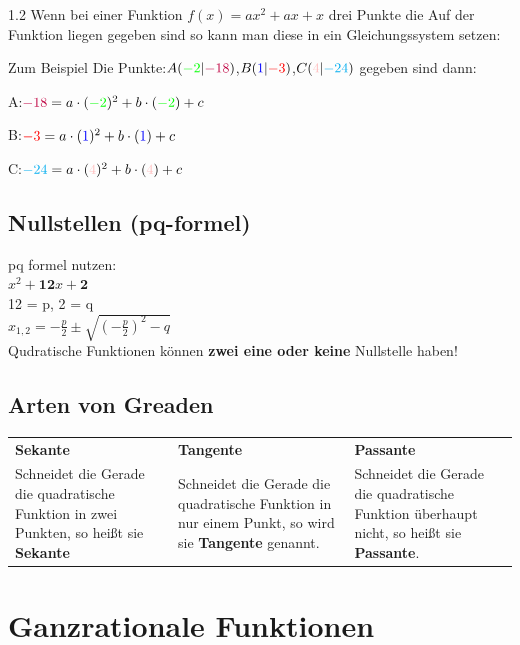 \documentclass{article}
\newcommand{\Zeilenabstand}{1.2}
\begin{document}
\begin{spacing}{\Zeilenabstand}
    Wenn bei einer Funktion $f(x)= ax^{2}+ax+x$ drei Punkte die Auf der Funktion liegen gegeben sind
    so kann man diese in ein Gleichungssystem setzen:

    Zum Beispiel Die Punkte:$A({\color{green}-2} | {\color{purple}- 18})$,$B({\color{blue}1}|{\color{red}-3})$,$C({\color{pink}4}|{\color{cyan}-24})$ gegeben sind dann:

    A:\@ ${\color{purple}-18} = a \cdot ({\color{green}-2})^2 +b \cdot ({\color{green}-2}) + c $

    B:\@ ${\color{red}-3} = a \cdot ({\color{blue}1})^2 +b \cdot ({\color{blue}1}) + c $

    C:\@ ${\color{cyan}-24} = a \cdot ({\color{pink}4})^2 +b \cdot ({\color{pink}4}) + c$



    \subsection{Nullstellen (pq-formel) }
    pq formel nutzen:\\
    $x^2 +\textbf{12}x +\textbf{2}$\\
    12 = p, 2 = q\\
    $x_{1,2} = -\frac{p}{2} \pm \sqrt{(-\frac{p}{2})^2-q}$\\
    Qudratische Funktionen können \textbf{zwei eine oder keine} Nullstelle haben!

    \subsection{Arten von Greaden}
    \hfill \break
    \begin{tabular}{p{5cm} p{5cm} p{5cm}}
        \textbf{Sekante} & \textbf{Tangente} & \textbf{Passante}\\
        Schneidet die Gerade die quadratische Funktion in zwei Punkten, so heißt sie \textbf{Sekante} &
        Schneidet die Gerade die quadratische Funktion in nur einem Punkt, so wird sie \textbf{Tangente} genannt. &
        Schneidet die Gerade die quadratische Funktion überhaupt nicht, so heißt sie \textbf{Passante}.\\
    \end{tabular}




    \newpage



    \section{Ganzrationale Funktionen}

\end{spacing}
\end{document}
